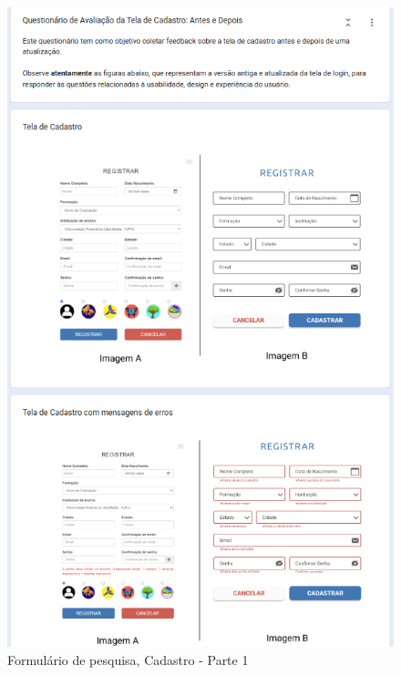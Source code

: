 \begin{figure}[!h]
	\begin{center}
	    \includegraphics[scale=0.6]{figs/Form/09.png}
	\end{center}
	\caption{\label{AP_CP01}Formulário de pesquisa, Cadastro - Parte 1}
\end{figure}

\newpage


